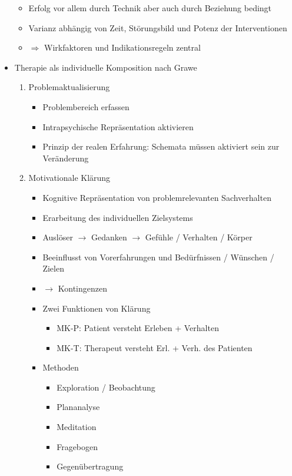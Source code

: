 \documentclass[11pt, paper=a4, twocolumn]{scrartcl}
\begin{document}
\begin{itemize}
\begin{itemize}
					\item Erfolg vor allem durch Technik aber auch durch Beziehung bedingt
					\item Varianz abhängig von Zeit, Störungsbild und Potenz der Interventionen
					\item $\Rightarrow$ Wirkfaktoren und Indikationsregeln zentral
				\end{itemize}
			\item Therapie als individuelle Komposition nach Grawe
				\begin{enumerate}
					\item Problemaktualisierung
						\begin{itemize}
							\item Problembereich erfassen
							\item Intrapsychische Repräsentation aktivieren
							\item Prinzip der realen Erfahrung: Schemata müssen aktiviert sein zur Veränderung
						\end{itemize}
					\item Motivationale Klärung
						\begin{itemize}
							\item Kognitive Repräsentation von problemrelevanten Sachverhalten
							\item Erarbeitung des individuellen Zielsystems
							\item Auslöser $\rightarrow$ Gedanken $\rightarrow$ Gefühle / Verhalten / Körper
							\item Beeinflusst von Vorerfahrungen und Bedürfnissen / Wünschen / Zielen
							\item $\rightarrow$ Kontingenzen
							\item Zwei Funktionen von Klärung
								\begin{itemize}
									\item MK-P: Patient versteht Erleben + Verhalten
									\item MK-T: Therapeut versteht Erl. + Verh. des Patienten
								\end{itemize}
							\item Methoden
								\begin{itemize}
									\item Exploration / Beobachtung
									\item Plananalyse
									\item Meditation
									\item Fragebogen
									\item Gegenübertragung

\end{itemize}
\end{itemize}
\end{enumerate}
\end{itemize}
\end{document}
